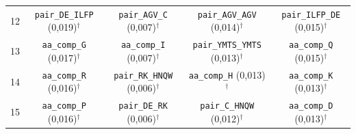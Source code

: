 \begin{table}[htbp]
\begin{tabular}{lcccc}
    12 & \texttt{pair\_DE\_ILFP} (0,019)$^\dagger$ & \texttt{pair\_AGV\_C} (0,007)$^\dagger$ & \texttt{pair\_AGV\_AGV} (0,014)$^\dagger$ & \texttt{pair\_ILFP\_DE} (0,015)$^\dagger$ \\
    13 & \texttt{aa\_comp\_G} (0,017)$^\dagger$ & \texttt{aa\_comp\_I} (0,007)$^\dagger$ & \texttt{pair\_YMTS\_YMTS} (0,013)$^\dagger$ & \texttt{aa\_comp\_Q} (0,015)$^\dagger$ \\
    14 & \texttt{aa\_comp\_R} (0,016)$^\dagger$ & \texttt{pair\_RK\_HNQW} (0,006)$^\dagger$ & \texttt{aa\_comp\_H} (0,013)$^\dagger$ & \texttt{aa\_comp\_K} (0,013)$^\dagger$ \\
    15 & \texttt{aa\_comp\_P} (0,016)$^\dagger$ & \texttt{pair\_DE\_RK} (0,006)$^\dagger$ & \texttt{pair\_C\_HNQW} (0,012)$^\dagger$ & \texttt{aa\_comp\_D} (0,013)$^\dagger$ \\
    \bottomrule
  \end{tabular}
\end{table}
